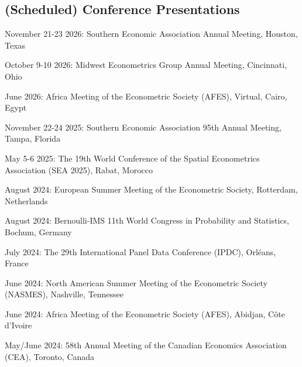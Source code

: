 \documentclass[12pt,letterpaper]{article}
\renewenvironment{itemize}{
  \begin{list}{}{
    \setlength{\leftmargin}{1.5em}
  }
}{
  \end{list}
}
\begin{document}
\subsection*{(Scheduled) Conference Presentations}
\begin{itemize} 
  \item November 21-23 2026: Southern Economic Association Annual Meeting, Houston, Texas
  
  \item October 9-10 2026: Midwest Econometrics Group Annual Meeting, Cincinnati, Ohio
  
  \item June 2026: Africa Meeting of the Econometric Society (AFES), Virtual, Cairo, Egypt
  
  \item November 22-24 2025: Southern Economic Association 95th Annual Meeting, Tampa, Florida
    
  \item May 5-6 2025: The 19th World Conference of the Spatial Econometrics Association (SEA 2025), Rabat, Morocco
  
  \item August 2024: European Summer Meeting of the Econometric Society, Rotterdam, Netherlands
  
  \item August 2024: Bernoulli-IMS 11th World Congress in Probability and Statistics, Bochum, Germany
  
  \item July 2024: The 29th International Panel Data Conference (IPDC), Orléans, France
  
  \item June 2024: North American Summer Meeting of the Econometric Society (NASMES), Nashville, Tennessee
  
  \item June 2024: Africa Meeting of the Econometric Society (AFES), Abidjan, Côte d'Ivoire
  
  \item May/June 2024: 58th Annual Meeting of the Canadian Economics Association (CEA), Toronto, Canada


\end{itemize}
\end{document}
